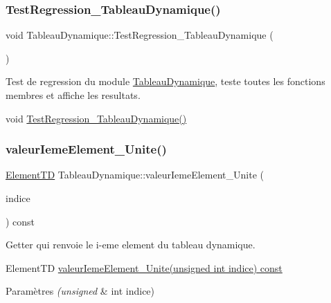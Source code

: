\subsubsection{\texorpdfstring{Test\+Regression\+\_\+\+Tableau\+Dynamique()}{TestRegression\_TableauDynamique()}}
{\footnotesize\ttfamily void Tableau\+Dynamique\+::\+Test\+Regression\+\_\+\+Tableau\+Dynamique (\begin{DoxyParamCaption}{ }\end{DoxyParamCaption})}



Test de regression du module \hyperlink{classTableauDynamique}{Tableau\+Dynamique}, teste toutes les fonctions membres et affiche les resultats. 

void \hyperlink{classTableauDynamique_a3875d8153fe023d3283709b9091d7a36}{Test\+Regression\+\_\+\+Tableau\+Dynamique()} \mbox{\label{classTableauDynamique_aaa3ea9b37c373c8d592ea2a7ac9d60ab}} 
\subsubsection{\texorpdfstring{valeur\+Ieme\+Element\+\_\+\+Unite()}{valeurIemeElement\_Unite()}}
{\footnotesize\ttfamily \hyperlink{classUnite}{Element\+TD} Tableau\+Dynamique\+::valeur\+Ieme\+Element\+\_\+\+Unite (\begin{DoxyParamCaption}\item[{unsigned int}]{indice }\end{DoxyParamCaption}) const}



Getter qui renvoie le i-\/eme element du tableau dynamique. 

Element\+TD \hyperlink{classTableauDynamique_aaa3ea9b37c373c8d592ea2a7ac9d60ab}{valeur\+Ieme\+Element\+\_\+\+Unite(unsigned int indice) const} 
\begin{DoxyParams}{Paramètres}
{\em (unsigned} & int indice) \\
\hline
\end{DoxyParams}
\mbox{\label{classTableauDynamique_a4acb54651eb6b46fcdb63ec1ea37b53a}} 
